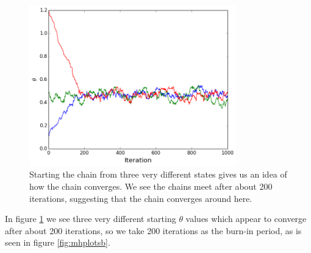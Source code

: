 \documentclass[a4paper,11pt,twoside]{article}
\begin{document}
\begin{figure}[!ht]
	\centering
	\includegraphics[width=0.8\textwidth]{convergence.png}
	\caption{Starting the chain from three very different states gives us
	an idea of how the chain converges. We see the chains meet after
	about 200 iterations, suggesting that the chain converges around here.}
	\label{fig:convergence}
\end{figure}
In figure \ref{fig:convergence} we see three very different starting $\theta$
values which appear to converge after about 200 iterations, so we take 200
iterations as the burn-in period, as is seen in figure \ref{fig:mhplotsb}.
\end{document}
